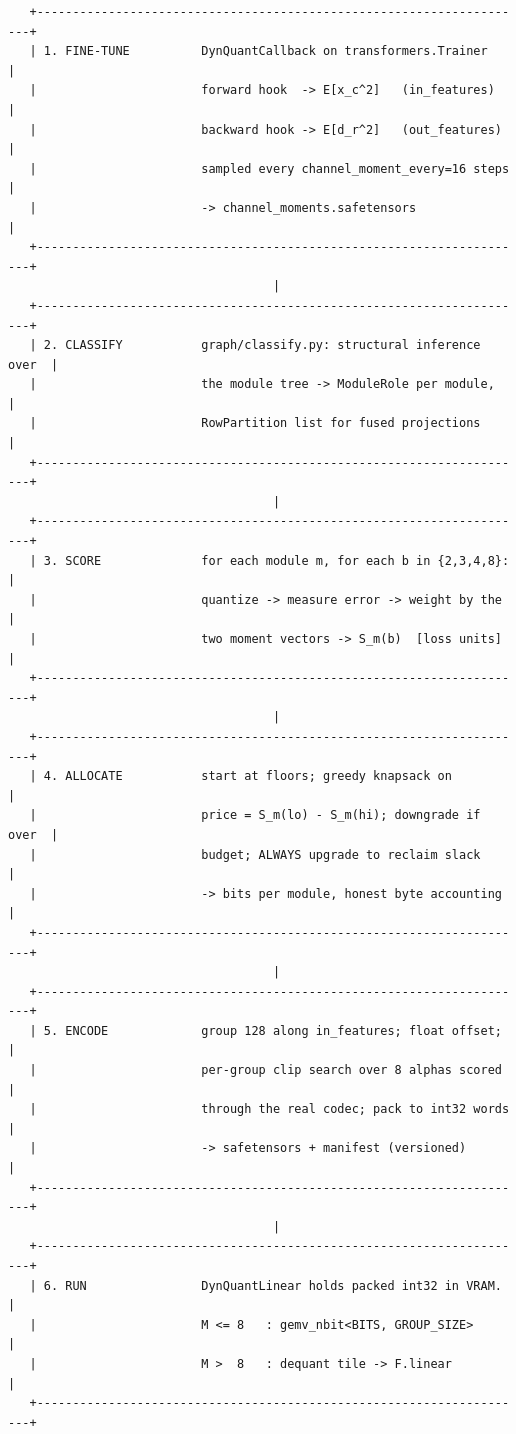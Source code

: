 \documentclass[11pt]{article}
\begin{document}
\begin{verbatim}
   +---------------------------------------------------------------------+
   | 1. FINE-TUNE          DynQuantCallback on transformers.Trainer      |
   |                       forward hook  -> E[x_c^2]   (in_features)     |
   |                       backward hook -> E[d_r^2]   (out_features)    |
   |                       sampled every channel_moment_every=16 steps   |
   |                       -> channel_moments.safetensors                |
   +---------------------------------------------------------------------+
                                     |
   +---------------------------------------------------------------------+
   | 2. CLASSIFY           graph/classify.py: structural inference over  |
   |                       the module tree -> ModuleRole per module,     |
   |                       RowPartition list for fused projections       |
   +---------------------------------------------------------------------+
                                     |
   +---------------------------------------------------------------------+
   | 3. SCORE              for each module m, for each b in {2,3,4,8}:   |
   |                       quantize -> measure error -> weight by the    |
   |                       two moment vectors -> S_m(b)  [loss units]    |
   +---------------------------------------------------------------------+
                                     |
   +---------------------------------------------------------------------+
   | 4. ALLOCATE           start at floors; greedy knapsack on           |
   |                       price = S_m(lo) - S_m(hi); downgrade if over  |
   |                       budget; ALWAYS upgrade to reclaim slack       |
   |                       -> bits per module, honest byte accounting    |
   +---------------------------------------------------------------------+
                                     |
   +---------------------------------------------------------------------+
   | 5. ENCODE             group 128 along in_features; float offset;    |
   |                       per-group clip search over 8 alphas scored    |
   |                       through the real codec; pack to int32 words   |
   |                       -> safetensors + manifest (versioned)         |
   +---------------------------------------------------------------------+
                                     |
   +---------------------------------------------------------------------+
   | 6. RUN                DynQuantLinear holds packed int32 in VRAM.    |
   |                       M <= 8   : gemv_nbit<BITS, GROUP_SIZE>        |
   |                       M >  8   : dequant tile -> F.linear           |
   +---------------------------------------------------------------------+
\end{verbatim}
\end{document}
